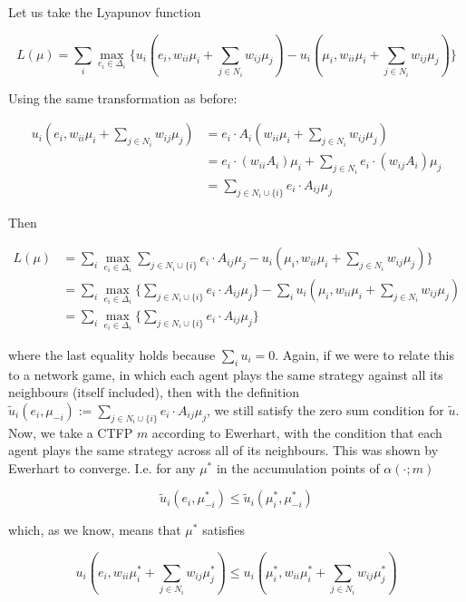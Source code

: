 \documentclass{article}
\theoremstyle{definition}
\begin{document}
	Let us take the Lyapunov function
	
	\begin{equation}
		L(\mu) = \sum_i \max_{e_i \in \Delta_i} \{u_i(e_i, w_{ii} \mu_i + \sum_{j \in N_i} w_{ij} \mu_j) - u_i(\mu_i, w_{ii} \mu_i + \sum_{j \in N_i} w_{ij} \mu_j) \}
	\end{equation}
	
	Using the same transformation as before:
	
	\begin{align}
		 u_i(e_i, w_{ii} \mu_i + \sum_{j \in N_i} w_{ij} \mu_j) & =  e_i \cdot A_i (w_{ii} \mu_i + \sum_{j \in N_i} w_{ij} \mu_j) \nonumber \\
		 & =  e_i \cdot (w_{ii} A_i) \mu_i + \sum_{j \in N_i} e_i \cdot (w_{ij} A_i) \mu_j \nonumber \\
		  & =  \sum_{j \in N_i \cup \{i\}} e_i \cdot A_{ij} \mu_j \nonumber 
	\end{align}
	
	Then
	
	\begin{align}
	L(\mu) &= \sum_i \max_{e_i \in \Delta_i}\sum_{j \in N_i \cup \{i\}} e_i \cdot A_{ij} \mu_j  - u_i(\mu_i, w_{ii} \mu_i + \sum_{j \in N_i} w_{ij} \mu_j) \} \nonumber \\
	&= \sum_i \max_{e_i \in \Delta_i} \{\sum_{j \in N_i \cup \{i\}} e_i \cdot A_{ij} \mu_j  \} - \sum_i  u_i(\mu_i, w_{ii} \mu_i + \sum_{j \in N_i} w_{ij} \mu_j) \nonumber \\
	&= \sum_i \max_{e_i \in \Delta_i} \{\sum_{j \in N_i \cup \{i\}} e_i \cdot A_{ij} \mu_j  \} \nonumber 
	\end{align}
	
	where the last equality holds because $\sum_i u_i = 0$. Again, if we were to relate this to a network game, in which each agent plays the same strategy against all its neighbours (itself included), then with the definition $ \tilde{u}_i (e_i, \mu_{-i}) := \sum_{j \in N_i \cup \{i\}} e_i \cdot A_{ij} \mu_j$, we still satisfy the zero sum condition for $\tilde{u}$. Now, we take a CTFP $m$ according to Ewerhart, with the condition that each agent plays the same strategy across all of its neighbours. This was shown by Ewerhart to converge. I.e. for any $\mu^*$ in the accumulation points of $\alpha(\cdot; m)$
	
	\begin{equation*}
		\tilde{u}_i(e_i, \mu_{-i}^*) \leq \tilde{u}_i(\mu_i^*, \mu_{-i}^*)
	\end{equation*}
	
	which, as we know, means that $\mu^*$ satisfies
	
	\begin{equation*}
		u_i(e_i, w_{ii} \mu_i^* + \sum_{j \in N_i} w_{ij} \mu_j^*) \leq  u_i(\mu_i^*, w_{ii} \mu_i^* + \sum_{j \in N_i} w_{ij} \mu_j^*)
	\end{equation*}
\end{document}
